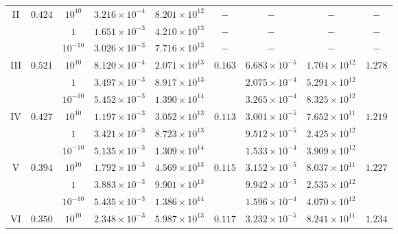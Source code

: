 \documentclass[twocolumn,aps,showpacs,showkeys,prd,superscriptaddress,byrevtex, amsmath]{revtex4-1}
\begin{document}
\begin{table}[t]
\begin{tabular}{c c c c c c c c c}
II & $0.424$ & $10^{10}$ & $3.216 \times 10^{-4}$ & $8.201 \times 10^{12}$ & $-$ & $-$ & $-$ & $-$ \\ 
 
 & & $1$ & $1.651 \times 10^{-3}$ & $4.210 \times 10^{13}$ & $-$ & $-$ & $-$ & $-$ \\ 

 & & $10^{-10}$ & $3.026 \times 10^{-3}$ & $7.716 \times 10^{13}$ & $-$ & $-$ & $-$ & $-$ \\ 

III & $0.521$ & $10^{10}$ & $8.120 \times 10^{-4}$ & $2.071 \times 10^{13}$ & $0.163$ & $6.683 \times 10^{-5}$ & $1.704 \times 10^{12}$ & $1.278$ \\ 

 & & $1$ & $3.497 \times 10^{-3}$ & $8.917 \times 10^{13}$ & & $2.075 \times 10^{-4}$ & $5.291 \times 10^{12}$ & \\ 

 & & $10^{-10}$ & $5.452 \times 10^{-3}$ & $1.390 \times 10^{14}$ & & $3.265 \times 10^{-4}$ & $8.325 \times 10^{12}$ & \\ 

IV & $0.427$ & $10^{10}$ & $1.197 \times 10^{-3}$ & $3.052 \times 10^{13}$ & $0.113$ & $3.001 \times 10^{-5}$ & $7.652 \times 10^{11}$ & $1.219$ \\ 

 & & $1$ & $3.421 \times 10^{-3}$ & $8.723 \times 10^{13}$ & & $9.512 \times 10^{-5}$ & $2.425 \times 10^{12}$ & \\ 

 & & $10^{-10}$ & $5.135 \times 10^{-3}$ & $1.309 \times 10^{14}$ & & $1.533 \times 10^{-4}$ & $3.909 \times 10^{12}$ & \\ 
 
V & $0.394$ & $10^{10}$ & $1.792 \times 10^{-3}$ & $4.569 \times 10^{13}$ & $0.115$ & $3.152 \times 10^{-5}$ & $8.037 \times 10^{11}$ & $1.227$\\ 

 & & $1$ & $3.883 \times 10^{-3}$ & $9.901 \times 10^{13}$ & & $9.942 \times 10^{-5}$ & $2.535 \times 10^{12}$ & \\ 

 & & $10^{-10}$ & $5.435 \times 10^{-3} $ & $1.386 \times 10^{14}$ & & $1.596 \times 10^{-4}$ & $4.070 \times 10^{12}$ & \\ 

VI & $0.350$ & $10^{10}$ & $2.348 \times 10^{-3}$ & $5.987 \times 10^{13}$ & $0.117$ & $3.232 \times 10^{-5}$ & $8.241 \times 10^{11}$ & $1.234$\\ 


\end{tabular}
\end{table}
\end{document}
